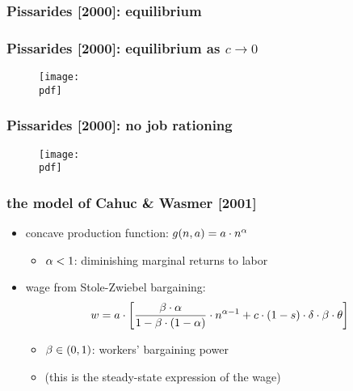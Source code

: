 \documentclass[12pt,xcolor={dvipsnames},hyperref={pdftex,pdfpagemode=UseNone,hidelinks,pdfdisplaydoctitle=true},usepdftitle=false]{beamer}
\def\pdf{xrationing.pdf}
\begin{document}
\begin{frame}
\frametitle{Pissarides [2000]: equilibrium}
\end{frame}

\begin{frame}
\frametitle{Pissarides [2000]: equilibrium as $c\to 0$}
\begin{figure}
\texttt{[image: \\pdf]}%
\end{figure}
\end{frame}

\begin{frame}
\frametitle{Pissarides [2000]: no job rationing}
\begin{figure}
\texttt{[image: \\pdf]}%
\end{figure}
\end{frame}


\begin{frame}
\frametitle{the model of Cahuc \& Wasmer [2001]}
\begin{itemize}
\item concave production function: $g(n,a)=a\cdot n^{\alpha}$
\begin{itemize}
\item $\alpha<1$: diminishing marginal returns to labor
\end{itemize}
\item wage from Stole-Zwiebel bargaining:
\begin{equation*}
w=a\cdot \left[  \frac{ \beta\cdot\alpha}{1-\beta\cdot (1-\alpha)}\cdot n^{\alpha-1}+c\cdot (1-s)\cdot \delta \cdot \beta
\cdot \theta \right]
\end{equation*}
\begin{itemize}
\item $\beta\in(0,1)$: workers' bargaining power
\item (this is the steady-state expression of the wage)
\end{itemize}
\end{itemize}
\end{frame}
\end{document}
